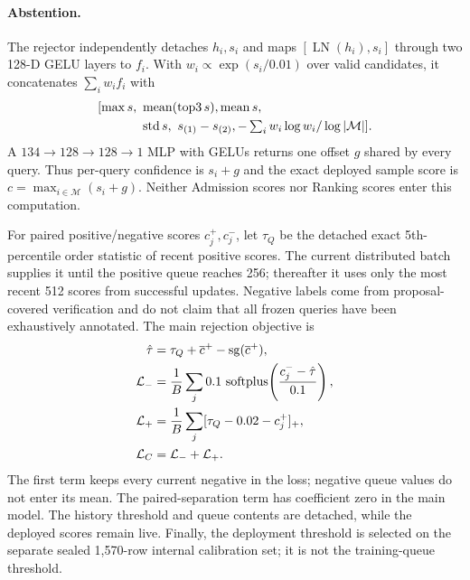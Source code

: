 \paragraph{Abstention.}
The rejector independently detaches $h_i,s_i$ and maps
$[\operatorname{LN}(h_i),s_i]$ through two 128-D GELU layers to $f_i$.  With
$w_i\propto\exp(s_i/0.01)$ over valid candidates, it concatenates
$\sum_iw_if_i$ with
\begin{equation*}
 \begin{aligned}
 \relax [\max s,\ &\operatorname{mean}(\operatorname{top3}s),
   \operatorname{mean}s,\\
  &\operatorname{std}s,\ s_{(1)}-s_{(2)},
   -\textstyle\sum_iw_i\log w_i/\log|\mathcal M|].
 \end{aligned}
\end{equation*}
A $134\!\to\!128\!\to\!128\!\to\!1$ MLP with GELUs returns one offset $g$
shared by every query.  Thus per-query confidence is $s_i+g$ and the exact
deployed sample score is $c=\max_{i\in\mathcal M}(s_i+g)$.  Neither Admission
scores nor Ranking scores enter this computation.

For paired positive/negative scores $c_j^+,c_j^-$, let $\tau_Q$ be the
detached exact 5th-percentile order statistic of recent positive scores.  The
current distributed batch supplies it until the positive queue reaches 256;
thereafter it uses only the most recent 512 scores from successful updates.
Negative labels come from proposal-covered verification and do not claim that
all frozen queries have been exhaustively annotated.
The main rejection objective is
\begin{align}
 \hat\tau&=\tau_Q+\overline c^+-\operatorname{sg}(\overline c^+),\\
 \mathcal L_-&=\frac{1}{B}\sum_j0.1\,
 \operatorname{softplus}\!\left(\frac{c_j^- -\hat\tau}{0.1}\right),\\
 \mathcal L_+&=\frac{1}{B}\sum_j[\tau_Q-0.02-c_j^+]_+,\\
 \mathcal L_C&=\mathcal L_-+\mathcal L_+ .
 \label{eq:supp-rejection-loss}
\end{align}
The first term keeps every current negative in the loss; negative queue values
do not enter its mean.  The paired-separation term has coefficient zero in the
main model.  The history threshold and queue contents are detached, while the
deployed scores remain live.  Finally, the deployment threshold is selected
on the separate sealed 1,570-row internal calibration set; it is not the
training-queue threshold.

